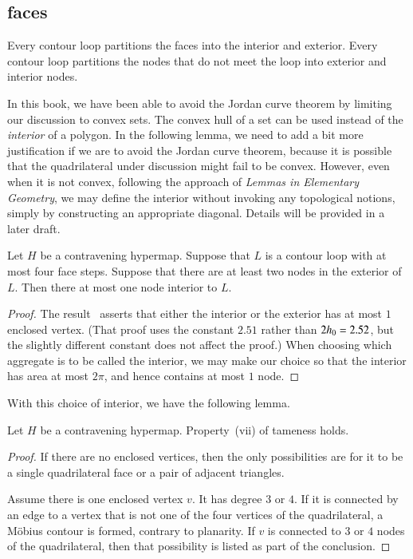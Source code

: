 \subsection{faces}


Every contour loop partitions the faces into the interior and
exterior.  Every contour loop partitions the nodes that do not meet
the loop into exterior and interior nodes.
%

\begin{note}%
In this book, we have been able to avoid the Jordan curve theorem by limiting our discussion to convex sets.  The convex hull of a set can be used instead of the {\it interior} of a polygon.  In the following lemma, we need to add a bit more justification if we are to avoid the Jordan curve theorem, because it is possible that the quadrilateral under discussion might fail to be convex.  However, even when it is not convex, following the approach of {\it Lemmas in Elementary Geometry}, we may define the interior without invoking any topological notions, simply by constructing an appropriate diagonal.  Details will be provided in a later draft.
\end{note}

\begin{lemma}\label{lemma:no-2}
Let $H$ be a contravening hypermap.
Suppose that $L$ is a contour loop with at most four face steps.
Suppose that there are at least two nodes in the exterior of $L$.
Then there at most one node interior to $L$.
\end{lemma}

\begin{proof}
The result~\cite[Lemma~4.2]{sp1} asserts that either the interior or the
exterior has at most $1$ enclosed vertex. (That proof uses the constant $2.51$ rather than $2{h_0}=2.52$, but the slightly different constant does not affect the proof.)   When choosing which
aggregate is to be called the interior, we may make our choice so
that the interior has area at most $2\pi$, and hence contains at
most $1$ node. 
\end{proof}

With this choice of interior, we have the following lemma.

\begin{lemma}
Let $H$ be a contravening hypermap. Property~(vii) of tameness
holds.
\end{lemma}

\begin{proof}
If there are no enclosed vertices, then the only possibilities are
for it to be a single quadrilateral face or a pair of adjacent
triangles.

Assume there is one enclosed vertex $v$.  It has degree $3$ or $4$.
If it is connected by an edge to a vertex that is not one of the
four vertices of the quadrilateral, a M\"obius contour is formed, contrary to planarity.
If $v$ is connected to $3$
or $4$ nodes of the quadrilateral, then that possibility is listed
as part of the conclusion.
\end{proof}

